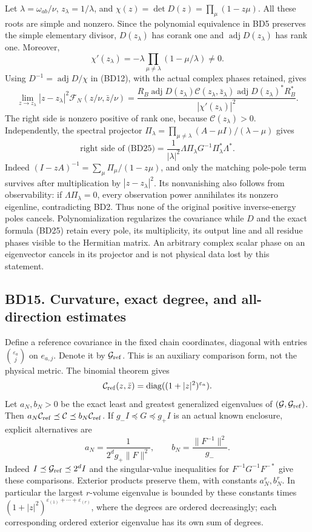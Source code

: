 \documentclass[11pt]{article}
\begin{document}
Let \(\lambda=\omega_{ab}/\nu\), \(z_\lambda=1/\lambda\), and \(\chi(z)=\det D(z)=\prod_\mu(1-z\mu)\). All these roots are simple and nonzero. Since the polynomial equivalence in BD5 preserves the simple elementary divisor, \(D(z_\lambda)\) has corank one and \(\operatorname{adj}D(z_\lambda)\) has rank one. Moreover, \[
\chi'(z_\lambda)=-\lambda\prod_{\mu\ne\lambda}(1-\mu/\lambda)\ne0.
\] Using \(D^{-1}=\operatorname{adj}D/\chi\) in (BD12), with the actual complex phases retained, gives \[
\lim_{z\to z_\lambda}|z-z_\lambda|^2\mathcal F_N(z/\nu,\bar z/\nu)
=\frac{R_B\operatorname{adj}D(z_\lambda)\mathcal C(z_\lambda,\bar z_\lambda)
\operatorname{adj}D(z_\lambda)^*R_B^*}{|\chi'(z_\lambda)|^2}. \tag{BD25}
\] The right side is nonzero positive of rank one, because \(\mathcal C(z_\lambda)>0\). Independently, the spectral projector \(\Pi_\lambda=\prod_{\mu\ne\lambda}(A-\mu I)/(\lambda-\mu)\) gives \[
\text{right side of (BD25)}
=\frac1{|\lambda|^2}\Lambda\Pi_\lambda G^{-1}\Pi_\lambda^*\Lambda^*.
\] Indeed \((I-zA)^{-1}=\sum_\mu\Pi_\mu/(1-z\mu)\), and only the matching pole-pole term survives after multiplication by \(|z-z_\lambda|^2\). Its nonvanishing also follows from observability: if \(\Lambda\Pi_\lambda=0\), every observation power annihilates its nonzero eigenline, contradicting BD2. Thus none of the original positive inverse-energy poles cancels. Polynomialization regularizes the covariance while \(D\) and the exact formula (BD25) retain every pole, its multiplicity, its output line and all residue phases visible to the Hermitian matrix. An arbitrary complex scalar phase on an eigenvector cancels in its projector and is not physical data lost by this statement.

\subsection{BD15. Curvature, exact degree, and all-direction estimates}\label{bd15.-curvature-exact-degree-and-all-direction-estimates}

Define a reference covariance in the fixed chain coordinates, diagonal with entries \(\binom{\varepsilon_a}{j}\) on \(e_{a,j}\). Denote it by \(\mathcal G_{\rm ref}\). This is an auxiliary comparison form, not the physical metric. The binomial theorem gives \[
\mathcal C_{\rm ref}(z,\bar z)=\operatorname{diag}((1+|z|^2)^{\varepsilon_a}).
\] Let \(a_N,b_N>0\) be the exact least and greatest generalized eigenvalues of \((\mathcal G,\mathcal G_{\rm ref})\). Then \(a_N\mathcal C_{\rm ref}\preceq\mathcal C\preceq b_N\mathcal C_{\rm ref}\). If \(g_-I\preceq G\preceq g_+I\) is an actual known enclosure, explicit alternatives are \[
a_N=\frac1{2^dg_+\|F\|^2},\qquad b_N=\frac{\|F^{-1}\|^2}{g_-}.
\] Indeed \(I\preceq\mathcal G_{\rm ref}\preceq2^dI\) and the singular-value inequalities for \(F^{-1}G^{-1}F^{-*}\) give these comparisons. Exterior products preserve them, with constants \(a_N^r,b_N^r\). In particular the largest \(r\)-volume eigenvalue is bounded by these constants times \((1+|z|^2)^{\varepsilon_{(1)}+\cdots+\varepsilon_{(r)}}\), where the degrees are ordered decreasingly; each corresponding ordered exterior eigenvalue has its own sum of degrees.
\end{document}
